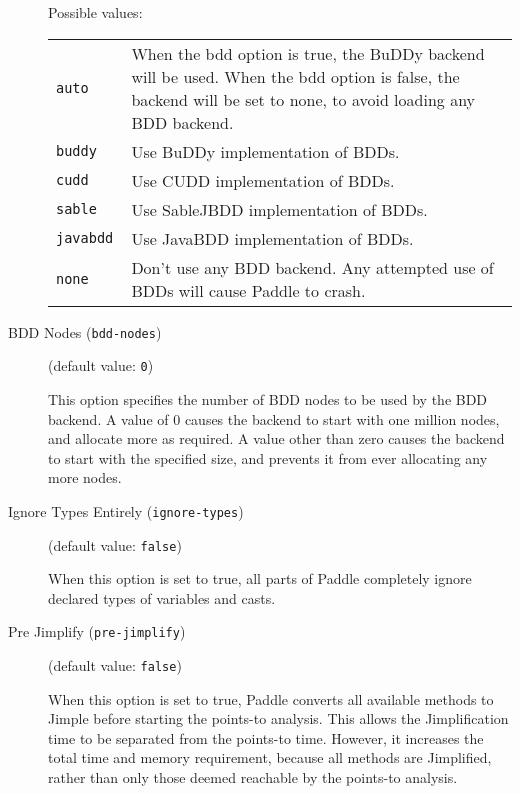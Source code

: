 \documentclass{article}
\begin{document}
\begin{description}
Possible values:\\
\begin{longtable}{p{1in}p{4in}}

{\tt auto }
&

When the bdd option is true, the BuDDy backend will be used.
When the bdd option is false, the backend will be set to none, to avoid
loading any BDD backend.
\\

{\tt buddy }
&

Use BuDDy implementation of BDDs.
\\

{\tt cudd }
&

Use CUDD implementation of BDDs.
\\

{\tt sable }
&
Use SableJBDD implementation of BDDs.\\

{\tt javabdd }
&

Use JavaBDD implementation of BDDs.
\\

{\tt none }
&

Don't use any BDD backend. Any attempted use of BDDs will cause Paddle to crash.
\\

\end{longtable}


\item[BDD Nodes ({\tt bdd-nodes})]
(default value: {\tt 0})




This option specifies the number of BDD nodes to be used by the BDD backend.
A value of 0 causes the backend to start with one million nodes, and allocate
more as required. A value other than zero causes the backend to start with
the specified size, and prevents it from ever allocating any more nodes.
        


\item[Ignore Types Entirely ({\tt ignore-types})]
(default value: {\tt false})




When this option is set to true, all parts of Paddle completely ignore
declared types of variables and casts.
        


\item[Pre Jimplify ({\tt pre-jimplify})]
(default value: {\tt false})




When this option is set to true, Paddle converts all available methods to Jimple
before starting the points-to analysis. This allows the Jimplification
time to be separated from the points-to time. However, it increases the
total time and memory requirement, because all methods are Jimplified,
rather than only those deemed reachable by the points-to analysis.
        


\end{description}
\end{document}
